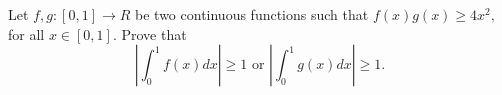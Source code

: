Let $ f,g:[0,1]\longrightarrow{R} $ be two continuous functions such that $ f(x)g(x)\ge 4x^2, $ for all $ x\in [0,1] . $ Prove that
$$ \left| \int_0^1 f(x)dx \right| \ge 1\text{ or } \left| \int_0^1 g(x)dx \right| \ge 1. $$